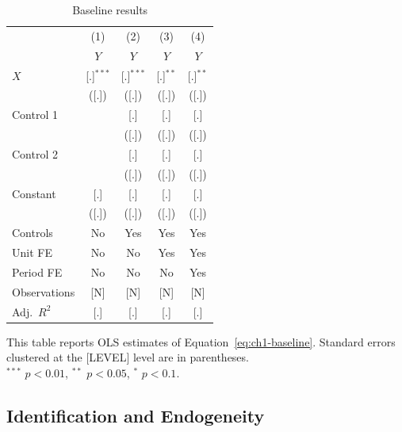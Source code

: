\documentclass[../main.tex]{subfiles}
\begin{document}
\begin{table}[p]
    \centering
    \caption{Baseline results}
    \label{tab:ch1-baseline}
    \begin{tabular}{lcccc}
        \toprule
                     & (1) & (2) & (3) & (4) \\
                     & $Y$ & $Y$ & $Y$ & $Y$ \\
        \midrule
        $X$          & [.]$^{***}$ & [.]$^{***}$ & [.]$^{**}$  & [.]$^{**}$ \\
                     & ([.])       & ([.])       & ([.])       & ([.])      \\
        Control 1    &             & [.]         & [.]         & [.]        \\
                     &             & ([.])       & ([.])       & ([.])      \\
        Control 2    &             & [.]         & [.]         & [.]        \\
                     &             & ([.])       & ([.])       & ([.])      \\
        Constant     & [.]         & [.]         & [.]         & [.]        \\
                     & ([.])       & ([.])       & ([.])       & ([.])      \\
        \midrule
        Controls     & No  & Yes & Yes & Yes \\
        Unit FE      & No  & No  & Yes & Yes \\
        Period FE    & No  & No  & No  & Yes \\
        Observations & [N] & [N] & [N] & [N] \\
        Adj.\ $R^2$  & [.] & [.] & [.] & [.] \\
        \bottomrule
    \end{tabular}

    \vspace{1mm}
    {\footnotesize
    This table reports OLS estimates of Equation~\eqref{eq:ch1-baseline}.
    Standard errors clustered at the [LEVEL] level are in parentheses.\\
    $^{***}$ $p<0.01$, $^{**}$ $p<0.05$, $^{*}$ $p<0.1$.
    }
\end{table}

\subsection{Identification and Endogeneity}
\lipsum[16]
\end{document}
